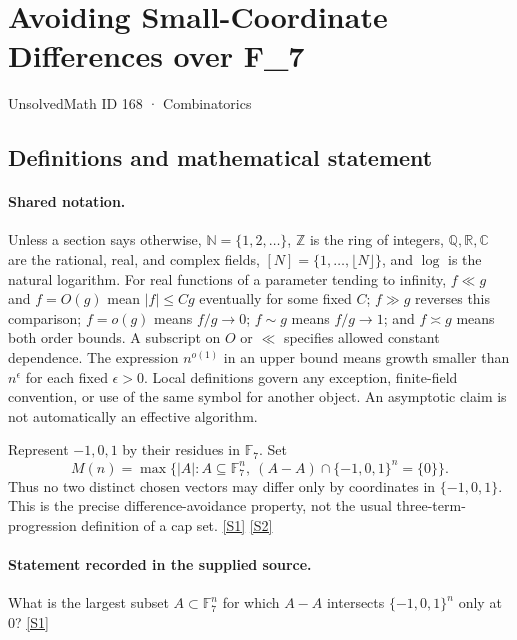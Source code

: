 \documentclass[11pt,a4paper]{article}
\newcommand{\N}{\mathbb{N}}
\newcommand{\Z}{\mathbb{Z}}
\newcommand{\Q}{\mathbb{Q}}
\newcommand{\R}{\mathbb{R}}
\newcommand{\C}{\mathbb{C}}
\newcommand{\F}{\mathbb{F}}
\newcommand{\sref}[2]{\hyperlink{source:#1:#2}{[S#2]}}
\begin{document}

\setcounter{section}{167}

\section{Avoiding Small-Coordinate Differences over F\_7}\label{168}

{\small\sffamily UnsolvedMath ID 168 · Combinatorics}

\subsection{Definitions and mathematical statement}

\paragraph{Shared notation.}Unless a section says otherwise, $\N=\{1,2,\ldots\}$,
$\Z$ is the ring of integers, $\Q,\R,\C$ are the rational, real, and complex
fields, $[N]=\{1,\ldots,\lfloor N\rfloor\}$, and $\log$ is the natural
logarithm. For real functions of a parameter tending to infinity,
$f\ll g$ and $f=O(g)$ mean $|f|\leq Cg$ eventually for some fixed $C$;
$f\gg g$ reverses this comparison; $f=o(g)$ means $f/g\to0$;
$f\sim g$ means $f/g\to1$; and $f\asymp g$ means both order bounds.
A subscript on $O$ or $\ll$ specifies allowed constant dependence.
The expression $n^{o(1)}$ in an upper bound means growth smaller than
$n^\epsilon$ for each fixed $\epsilon>0$. Local definitions govern any
exception, finite-field convention, or use of the same symbol for another
object. An asymptotic claim is not automatically an effective algorithm.



Represent $-1,0,1$ by their residues in $\F_7$. Set
\[M(n)=\max\{|A|:A\subseteq\F_7^n,\ (A-A)\cap\{-1,0,1\}^n=\{0\}\}.\]
Thus no two distinct chosen vectors may differ only by coordinates in $\{-1,0,1\}$. This is the precise difference-avoidance property, not the usual three-term-progression definition of a cap set. \sref{168}{1} \sref{168}{2}

\paragraph{Statement recorded in the supplied source.}
What is the largest subset $A \subset \mathbb{F}_7^n$ for which $A - A$ intersects $\{-1, 0, 1\}^n$ only at 0? \sref{168}{1}
\end{document}
